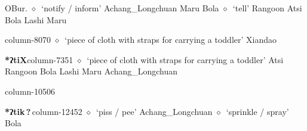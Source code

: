          OBur. 
\hspace{1ex}
         $\diamond$~`notify / inform'
         Achang\_Longchuan 
\hspace{1ex}
         Maru 
\hspace{1ex}
         Bola 
\hspace{1ex}
         $\diamond$~`tell'
         Rangoon 
\hspace{1ex}
         Atsi 
\hspace{1ex}
         Bola 
\hspace{1ex}
         Lashi 
\hspace{1ex}
         Maru 
  \item {\footnotesize \textbf{}}{\tiny column-8070}
         $\diamond$~`piece of cloth with straps for carrying a toddler'
         Xiandao 
  \item {\footnotesize \textbf{*ʔtiX}}{\tiny column-7351}
         $\diamond$~`piece of cloth with straps for carrying a toddler'
         Atsi 
\hspace{1ex}
         Rangoon 
\hspace{1ex}
         Bola 
\hspace{1ex}
         Lashi 
\hspace{1ex}
         Maru 
\hspace{1ex}
         Achang\_Longchuan 
  \item {\footnotesize \textbf{}}{\tiny column-10506}
  \item {\footnotesize \textbf{*ʔtik\,?\,}}{\tiny column-12452}
         $\diamond$~`piss / pee'
         Achang\_Longchuan 
\hspace{1ex}
         $\diamond$~`sprinkle / spray'
         Bola 
\hspace{1ex}
